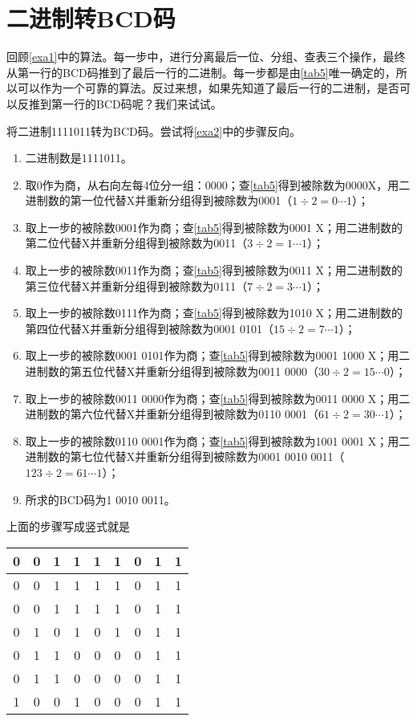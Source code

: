 \section{二进制转BCD码}\label{sec31}
回顾\autoref{exa1}中的算法。每一步中，进行分离最后一位、分组、查表三个操作，最终从第一行的BCD码推到了最后一行的二进制。每一步都是由\autoref{tab5}唯一确定的，所以可以作为一个可靠的算法。反过来想，如果先知道了最后一行的二进制，是否可以反推到第一行的BCD码呢？我们来试试。
\begin{example}{}{}
将二进制1111011转为BCD码。尝试将\autoref{exa2}中的步骤反向。
\begin{enumerate}
\item 二进制数是1111011。
\item 取0作为商，从右向左每4位分一组：0000；查\autoref{tab5}得到被除数为0000X，用二进制数的第一位代替X并重新分组得到被除数为0001（$1\div 2=0\cdots 1$）；
\item 取上一步的被除数0001作为商；查\autoref{tab5}得到被除数为0001 X；用二进制数的第二位代替X并重新分组得到被除数为0011（$3\div 2=1\cdots 1$）；
\item 取上一步的被除数0011作为商；查\autoref{tab5}得到被除数为0011 X；用二进制数的第三位代替X并重新分组得到被除数为0111（$7\div 2=3\cdots 1$）；
\item 取上一步的被除数0111作为商；查\autoref{tab5}得到被除数为1010 X；用二进制数的第四位代替X并重新分组得到被除数为0001 0101（$15\div 2=7\cdots 1$）；
\item 取上一步的被除数0001 0101作为商；查\autoref{tab5}得到被除数为0001 1000 X；用二进制数的第五位代替X并重新分组得到被除数为0011 0000（$30\div 2=15\cdots 0$）；
\item 取上一步的被除数0011 0000作为商；查\autoref{tab5}得到被除数为0011 0000 X；用二进制数的第六位代替X并重新分组得到被除数为0110 0001（$61\div 2=30\cdots 1$）；
\item 取上一步的被除数0110 0001作为商；查\autoref{tab5}得到被除数为1001 0001 X；用二进制数的第七位代替X并重新分组得到被除数为0001 0010 0011（$123\div 2=61\cdots 1$）；
\item 所求的BCD码为1 0010 0011。
\end{enumerate}
上面的步骤写成竖式就是
\begin{center}
\begin{tabular}{|ccccccccc|}
\hline
0&0&1&\multicolumn{1}{|c}{1}&1&1&0&1&1\\\hline
0&0&1&1&\multicolumn{1}{|c}{1}&1&0&1&1\\\hline
0&0&1&1&1&\multicolumn{1}{|c}{1}&0&1&1\\\hline
0&1&\multicolumn{1}{|c}{0}&1&0&1&\multicolumn{1}{|c}{0}&1&1\\\hline
0&1&1&\multicolumn{1}{|c}{0}&0&0&0&\multicolumn{1}{|c}{1}&1\\\hline
0&1&1&0&\multicolumn{1}{|c}{0}&0&0&1&\multicolumn{1}{|c|}{1}\\\hline
1&\multicolumn{1}{|c}{0}&0&1&0&\multicolumn{1}{|c}{0}&0&1&1\\\hline
\end{tabular}
\end{center}
\end{example}
